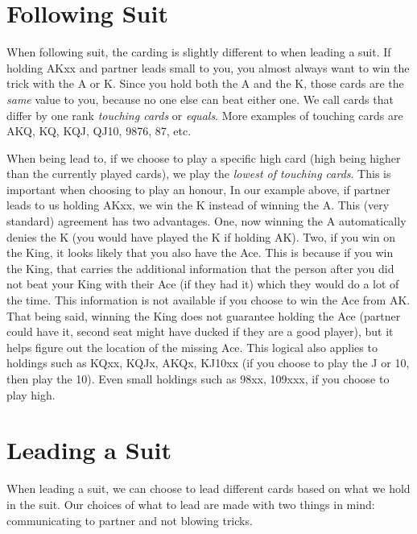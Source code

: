 \documentclass[a4paper]{JoshCards}
\begin{document}
\section*{Following Suit}

When following suit, the carding is slightly different to when leading a suit. If holding AKxx and partner leads small to you, you almost always want to win the trick with the A or K. Since you hold both the A and the K, those cards are the \textit{same} value to you, because no one else can beat either one. We call cards that differ by one rank \textit{touching cards} or \textit{equals}. More examples of touching cards are AKQ, KQ, KQJ, QJ10, 9876, 87, etc.

When being lead to, if we choose to play a specific high card (high being higher than the currently played cards), we play the \textit{lowest of touching cards}. This is important when choosing to play an honour, In our example above, if partner leads to us holding AKxx, we win the K instead of winning the A. This (very standard) agreement has two advantages. One, now winning the A automatically denies the K (you would have played the K if holding AK). Two, if you win on the King, it looks likely that you also have the Ace. This is because if you win the King, that carries the additional information that the person after you did not beat your King with their Ace (if they had it) which they would do a lot of the time. This information is not available if you choose to win the Ace from AK. That being said, winning the King does not guarantee holding the Ace (partner could have it, second seat might have ducked if they are a good player), but it helps figure out the location of the missing Ace. This logical also applies to holdings such as KQxx, KQJx, AKQx, KJ10xx (if you choose to play the J or 10, then play the 10). Even small holdings such as 98xx, 109xxx, if you choose to play high.


\section*{Leading a Suit}

When leading a suit, we can choose to lead different cards based on what we hold in the suit. Our choices of what to lead are made with two things in mind: communicating to partner and not blowing tricks. 
\end{document}
